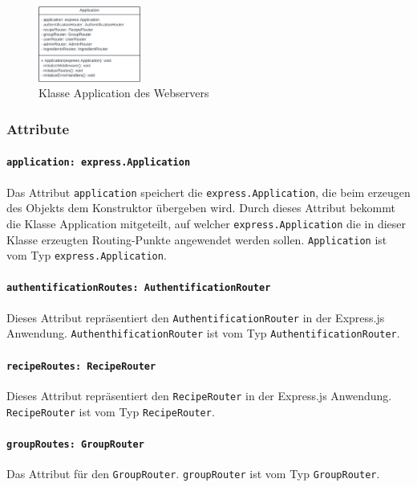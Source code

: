 \documentclass{entwurfsheft}
\begin{document}
\begin{figure}[htp]
    \centering
    \includegraphics[width = 0.3\textwidth]{images/webserver/application.pdf}
    \caption{Klasse Application des Webservers}
    \label{fig:application}
\end{figure}


\subsubsection*{Attribute}
\paragraph{\texttt{application: express.Application}}
Das Attribut \texttt{application} speichert die \newline
\texttt{express.Application}, die beim erzeugen des Objekts dem Konstruktor übergeben wird.
Durch dieses Attribut bekommt die Klasse Application mitgeteilt, auf welcher \texttt{express.Application} die in dieser Klasse erzeugten Routing-Punkte angewendet werden sollen.
\texttt{Application} ist vom Typ \texttt{express.Application}.
\paragraph{\texttt{authentificationRoutes: AuthentificationRouter}}
Dieses Attribut repräsentiert den \newline
\texttt{AuthentificationRouter} in der Express.js Anwendung. \texttt{AuthenthificationRouter} ist vom Typ \texttt{AuthentificationRouter}.
\paragraph{\texttt{recipeRoutes: RecipeRouter}}
Dieses Attribut repräsentiert den \texttt{RecipeRouter} in der Express.js Anwendung. \texttt{RecipeRouter} ist vom Typ \texttt{RecipeRouter}.
\paragraph{\texttt{groupRoutes: GroupRouter}}
Das Attribut für den \texttt{GroupRouter}. \texttt{groupRouter} ist vom \newline
Typ \texttt{GroupRouter}.
\end{document}
